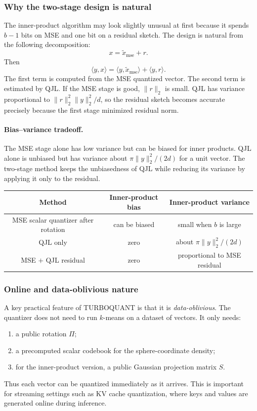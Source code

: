 \subsubsection*{Why the two-stage design is natural}

The inner-product algorithm may look slightly unusual at first because it spends $b-1$ bits on MSE and one bit on a residual sketch.
The design is natural from the following decomposition:
\begin{equation}
    x=\widetilde x_{\mathrm{mse}}+r.
\end{equation}
Then
\begin{equation}
    \langle y,x\rangle
    =\langle y,\widetilde x_{\mathrm{mse}}\rangle+\langle y,r\rangle.
\end{equation}
The first term is computed from the MSE quantized vector.
The second term is estimated by QJL.
If the MSE stage is good, $\|r\|_2$ is small.
QJL has variance proportional to $\|r\|_2^2\|y\|_2^2/d$, so the residual sketch becomes accurate precisely because the first stage minimized residual norm.

\paragraph{Bias--variance tradeoff.}
The MSE stage alone has low variance but can be biased for inner products.
QJL alone is unbiased but has variance about $\pi\|y\|_2^2/(2d)$ for a unit vector.
The two-stage method keeps the unbiasedness of QJL while reducing its variance by applying it only to the residual.

\begin{center}
\begin{tabular}{c|c|c}
Method & Inner-product bias & Inner-product variance \\
\hline
MSE scalar quantizer after rotation & can be biased & small when $b$ is large \\
QJL only & zero & about $\pi\|y\|_2^2/(2d)$ \\
MSE $+$ QJL residual & zero & proportional to MSE residual
\end{tabular}
\end{center}

\subsubsection*{Online and data-oblivious nature}

A key practical feature of TURBOQUANT is that it is \emph{data-oblivious}.
The quantizer does not need to run $k$-means on a dataset of vectors.
It only needs:
\begin{enumerate}[leftmargin=2em]
    \item a public rotation $\Pi$;
    \item a precomputed scalar codebook for the sphere-coordinate density;
    \item for the inner-product version, a public Gaussian projection matrix $S$.
\end{enumerate}
Thus each vector can be quantized immediately as it arrives.
This is important for streaming settings such as KV cache quantization, where keys and values are generated online during inference.

